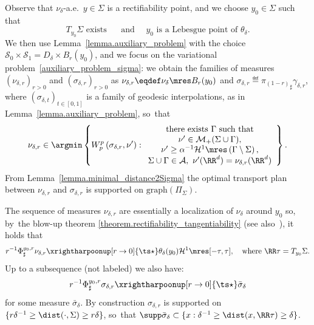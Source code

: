 Observe that $\nu_\delta$-a.e.~$y \in \Sigma$ is a rectifiability point, and we choose $y_0 \in \Sigma$ such that
\begin{equation}\label{y0fixed_for_blowup}
T_{y_0}\Sigma \text{ exists }
\quad\text{ and } \quad
y_0 \text{ is a Lebesgue point of }
\theta_\delta.
\end{equation}
We then use Lemma~\ref{lemma.auxiliary_problem} with the choice $\mathcal{S}_0\times \mathcal{S}_1 = D_{\delta}\times B_r(y_0)$, and we focus on the variational problem~\eqref{auxiliary_problem_sigma}: we obtain the families of measures $\left(\nu_{\delta ,r}\right)_{r > 0}$ and $\left(\sigma_{\delta ,r}\right)_{r > 0}$ as $\nu_{\delta ,r} \eqdef \nu_\delta \mres B_r(y_0)$ and $\sigma_{\delta ,r} \eqdef {\pi_{(1-r)}}_\sharp\gamma_{\delta,r}$, where $\left(\sigma_{\delta,t}\right)_{t \in [0,1]}$ is a family of geodesic interpolations, as in Lemma~\ref{lemma.auxiliary_problem}, so~that
\begin{equation}\label{auxiliary_problem_geodesic}
\nu_{\delta ,r}
\in
\argmin
\left\{
W_p^p\left(
\sigma_{\delta ,r}, \nu'
\right) :
\begin{array}{c}
\text{there exists $\Gamma$ such that}\\
\nu' \in \mathcal{M}_+(\Sigma \cup \Gamma),\\
\nu' \ge \alpha^{-1}\mathcal{H}^1\mres \left(\Gamma\setminus \Sigma\right), \\
\Sigma \cup \Gamma \in \mathcal{A}, \
\nu'(\RR^d) = \nu_{\delta ,r}(\RR^d)
\end{array}
\right\}.
\end{equation}
From Lemma~\ref{lemma.minimal_distance2Sigma} the optimal transport plan between $\nu_{\delta ,r}$ and $\sigma_{\delta ,r}$ is supported on $\text{graph}(\Pi_\Sigma)$.

The sequence of measures $\nu_{\delta ,r}$ are essentially a localization of $\nu_\delta$ around $y_0$ so, by~the blow-up theorem \ref{theorem.rectifiability_tangentiability} (see also~\cite[Th.\,2.83]{ambrosio2000functions}), it holds that
\begin{equation}\label{blowup_measures_nu}
r^{-1}\Phi^{y_0,r}_{\sharp}\nu_{\delta ,r} \xrightharpoonup[r \to 0]{\ts\star}
\theta_\delta(y_0)\mathcal{H}^1\mres [-\tau, \tau],
\quad\text{where $\RR\tau = T_{y_0}\Sigma$.}
\end{equation}
Up to a subsequence (not labeled) we also have:
\begin{equation}\label{blowup_measures_sigma}
r^{-1}\Phi^{y_0,r}_{\sharp}\sigma_{\delta ,r} \xrightharpoonup[r \to 0]{\ts\star}
\bar \sigma_{\delta}
\end{equation}
for some measure $\bar \sigma_{\delta}$.
By construction $\sigma_{\delta ,r}$ is supported on $\{r\delta^{-1}\ge\dist(\cdot,\Sigma)\ge r\delta\}$, so~that $\supp \bar \sigma_{\delta} \subset \{x : \delta^{-1} \ge \dist(x,\RR\tau) \ge \delta \}$.

